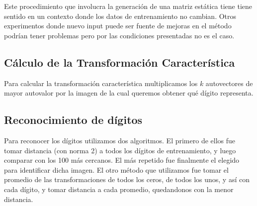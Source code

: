 Este procedimiento que involucra la generaci\'on de una matriz est\'atica tiene tiene sentido en un contexto
donde los datos de entrenamiento no cambian. Otros experimentos donde nuevo input puede ser fuente de mejoras
en el m\'etodo podr\'ian tener problemas pero por las condiciones presentadas no es el caso.

\subsection{C\'alculo de la Transformaci\'on Caracter\'istica}
Para calcular la transformaci\'on caracter\'istica multiplicamos los $k$ autovectores de mayor autovalor por
la imagen de la cual queremos obtener qu\'e d\'igito representa.



\subsection{Reconocimiento de d\'igitos}
Para reconocer los d\'igitos utilizamos dos algoritmos. El primero de ellos fue tomar distancia (con norma 2) a
todos los d\'igitos de entrenamiento, y luego comparar con los 100 m\'as cercanos. El m\'as repetido fue finalmente
el elegido para identificar dicha imagen. El otro m\'etodo que utilizamos fue tomar el promedio de las transformaciones
de todos los ceros, de todos los unos, y as\'i con cada d\'igito, y tomar distancia a cada promedio, quedandonos con la
menor distancia.
